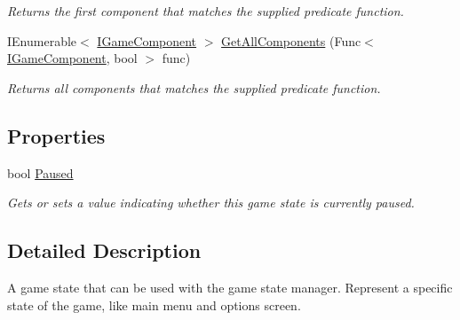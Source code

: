 \begin{DoxyCompactItemize}
\begin{DoxyCompactList}\small\item\em Returns the first component that matches the supplied predicate function. \end{DoxyCompactList}\item 
I\-Enumerable$<$ \hyperlink{interface_tri_devs_1_1_tri_engine2_d_1_1_interfaces_1_1_i_game_component}{I\-Game\-Component} $>$ \hyperlink{interface_tri_devs_1_1_tri_engine2_d_1_1_state_management_1_1_i_game_state_a98817ddd776404ed5d8f4c49163761e3}{Get\-All\-Components} (Func$<$ \hyperlink{interface_tri_devs_1_1_tri_engine2_d_1_1_interfaces_1_1_i_game_component}{I\-Game\-Component}, bool $>$ func)
\begin{DoxyCompactList}\small\item\em Returns all components that matches the supplied predicate function. \end{DoxyCompactList}\end{DoxyCompactItemize}
\subsection*{Properties}
\begin{DoxyCompactItemize}
\item 
bool \hyperlink{interface_tri_devs_1_1_tri_engine2_d_1_1_state_management_1_1_i_game_state_a0e8d01cc01d98aa24521e4314e219d28}{Paused}
\begin{DoxyCompactList}\small\item\em Gets or sets a value indicating whether this game state is currently paused. \end{DoxyCompactList}\end{DoxyCompactItemize}


\subsection{Detailed Description}
A game state that can be used with the game state manager. Represent a specific state of the game, like main menu and options screen. 



